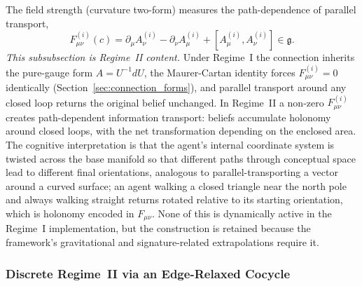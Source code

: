 \documentclass[11pt]{article}
\begin{document}
The field strength (curvature two-form) measures the path-dependence of parallel transport,
\begin{equation}
F^{(i)}_{\mu\nu}(c) = \partial_\mu A^{(i)}_\nu - \partial_\nu A^{(i)}_\mu + [A^{(i)}_\mu, A^{(i)}_\nu] \in \mathfrak{g}.
\label{eq:field_strength}
\end{equation}
\emph{This subsubsection is Regime~II content.} Under Regime~I the connection inherits the pure-gauge form $A = U^{-1}dU$, the Maurer-Cartan identity forces $F^{(i)}_{\mu\nu} = 0$ identically (Section~\ref{sec:connection_forms}), and parallel transport around any closed loop returns the original belief unchanged. In Regime~II a non-zero $F^{(i)}_{\mu\nu}$ creates path-dependent information transport: beliefs accumulate holonomy around closed loops, with the net transformation depending on the enclosed area. The cognitive interpretation is that the agent's internal coordinate system is twisted across the base manifold so that different paths through conceptual space lead to different final orientations, analogous to parallel-transporting a vector around a curved surface; an agent walking a closed triangle near the north pole and always walking straight returns rotated relative to its starting orientation, which is holonomy encoded in $F_{\mu\nu}$. None of this is dynamically active in the Regime~I implementation, but the construction is retained because the framework's gravitational and signature-related extrapolations require it.

\subsubsection{Discrete Regime~II via an Edge-Relaxed Cocycle}
\label{sec:discrete_regime_ii}
\end{document}
